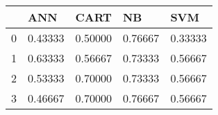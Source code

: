 \begin{tabular}{|l|l|l|l|l|}
\toprule
{} &      ANN &     CART &       NB &      SVM \\
\midrule
0 &  0.43333 &  0.50000 &  0.76667 &  0.33333 \\
1 &  0.63333 &  0.56667 &  0.73333 &  0.56667 \\
2 &  0.53333 &  0.70000 &  0.73333 &  0.56667 \\
3 &  0.46667 &  0.70000 &  0.76667 &  0.56667 \\
\bottomrule
\end{tabular}
